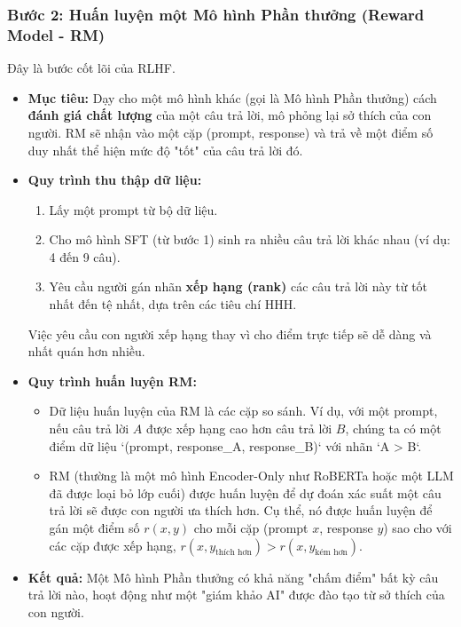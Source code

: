 \subsubsection{Bước 2: Huấn luyện một Mô hình Phần thưởng (Reward Model - RM)}
Đây là bước cốt lõi của RLHF.
\begin{itemize}
    \item \textbf{Mục tiêu:} Dạy cho một mô hình khác (gọi là Mô hình Phần thưởng) cách \textbf{đánh giá chất lượng} của một câu trả lời, mô phỏng lại sở thích của con người. RM sẽ nhận vào một cặp (prompt, response) và trả về một điểm số duy nhất thể hiện mức độ "tốt" của câu trả lời đó.
    \item \textbf{Quy trình thu thập dữ liệu:}
        \begin{enumerate}
            \item Lấy một prompt từ bộ dữ liệu.
            \item Cho mô hình SFT (từ bước 1) sinh ra nhiều câu trả lời khác nhau (ví dụ: 4 đến 9 câu).
            \item Yêu cầu người gán nhãn \textbf{xếp hạng (rank)} các câu trả lời này từ tốt nhất đến tệ nhất, dựa trên các tiêu chí HHH.
        \end{enumerate}
        Việc yêu cầu con người xếp hạng thay vì cho điểm trực tiếp sẽ dễ dàng và nhất quán hơn nhiều.
    \item \textbf{Quy trình huấn luyện RM:}
        \begin{itemize}
            \item Dữ liệu huấn luyện của RM là các cặp so sánh. Ví dụ, với một prompt, nếu câu trả lời $A$ được xếp hạng cao hơn câu trả lời $B$, chúng ta có một điểm dữ liệu `(prompt, response\_A, response\_B)` với nhãn `A > B`.
            \item RM (thường là một mô hình Encoder-Only như RoBERTa hoặc một LLM đã được loại bỏ lớp cuối) được huấn luyện để dự đoán xác suất một câu trả lời sẽ được con người ưa thích hơn. Cụ thể, nó được huấn luyện để gán một điểm số $r(x, y)$ cho mỗi cặp (prompt $x$, response $y$) sao cho với các cặp được xếp hạng, $r(x, y_{\text{thích hơn}}) > r(x, y_{\text{kém hơn}})$.
        \end{itemize}
    \item \textbf{Kết quả:} Một Mô hình Phần thưởng có khả năng "chấm điểm" bất kỳ câu trả lời nào, hoạt động như một "giám khảo AI" được đào tạo từ sở thích của con người.
\end{itemize}

